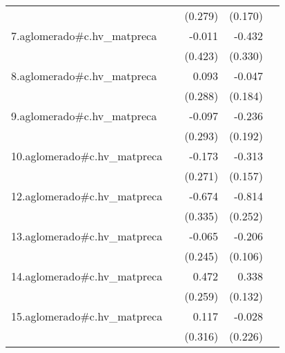 {\begin{longtable}{l*{4}{D{.}{.}{-1}}}
            &                     &     (0.279)         &     (0.170)         &                     \\
\addlinespace
7.aglomerado#c.hv\_matpreca&                     &      -0.011         &      -0.432         &                     \\
            &                     &     (0.423)         &     (0.330)         &                     \\
\addlinespace
8.aglomerado#c.hv\_matpreca&                     &       0.093         &      -0.047         &                     \\
            &                     &     (0.288)         &     (0.184)         &                     \\
\addlinespace
9.aglomerado#c.hv\_matpreca&                     &      -0.097         &      -0.236         &                     \\
            &                     &     (0.293)         &     (0.192)         &                     \\
\addlinespace
10.aglomerado#c.hv\_matpreca&                     &      -0.173         &      -0.313\sym{*}  &                     \\
            &                     &     (0.271)         &     (0.157)         &                     \\
\addlinespace
12.aglomerado#c.hv\_matpreca&                     &      -0.674\sym{*}  &      -0.814\sym{**} &                     \\
            &                     &     (0.335)         &     (0.252)         &                     \\
\addlinespace
13.aglomerado#c.hv\_matpreca&                     &      -0.065         &      -0.206         &                     \\
            &                     &     (0.245)         &     (0.106)         &                     \\
\addlinespace
14.aglomerado#c.hv\_matpreca&                     &       0.472         &       0.338\sym{*}  &                     \\
            &                     &     (0.259)         &     (0.132)         &                     \\
\addlinespace
15.aglomerado#c.hv\_matpreca&                     &       0.117         &      -0.028         &                     \\
            &                     &     (0.316)         &     (0.226)         &                     \\

\end{longtable}}
